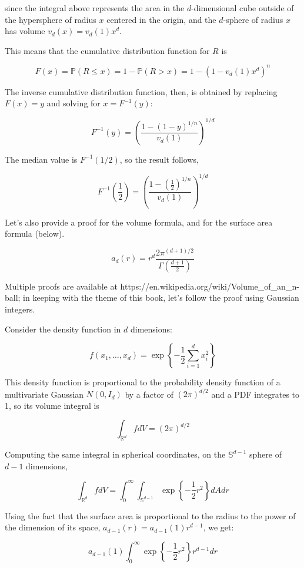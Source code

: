 since the integral above represents the area in the \(d\)-dimensional
cube outside of the hypersphere of radius \(x\) centered in the origin,
and the \(d\)-sphere of radius \(x\) has volume \(v_d(x) = v_d(1) x^d\).

This means that the cumulative distribution function for \(R\) is

\[F(x) = \mathbb{P}(R \leq x) = 1 - \mathbb{P}(R > x) = 1 - \left(1 - v_d(1) x^d\right)^n\]

The inverse cumulative distribution function, then, is obtained by
replacing \(F(x) = y\) and solving for \(x = F^{-1}(y)\):

\[ F^{-1}(y) = \left( \frac{1 - (1 - y)^{1/n}}{v_d(1)} \right)^{1/d} \]

The median value is \(F^{-1}(1/2)\), so the result follows,

\[ F^{-1}\left( \frac{1}{2} \right) = \left( \frac{1 - \left( \frac{1}{2} \right)^{1/n}}{v_d(1)} \right)^{1/d}\]

Let's also provide a proof for the volume formula, and for the surface
area formula (below).

\[ a_d(r) = r^d \frac{2 \pi^{(d + 1)/2}}{\Gamma \left( \frac{d + 1}{2}\right)}  \]

Multiple proofs are available at
https://en.wikipedia.org/wiki/Volume\_of\_an\_n-ball; in keeping with
the theme of this book, let's follow the proof using Gaussian integers.

Consider the density function in \(d\) dimensions:

\[ f(x_1, \dots, x_d) = \exp \left\{ -\frac{1}{2} \sum_{i=1}^d x_i^2 \right\} \]

This density function is proportional to the probability density
function of a multivariate Gaussian \(N(0, I_d)\) by a factor of
\((2 \pi)^{d/2}\) and a PDF integrates to 1, so its volume integral is

\[ \int_{\mathbb{R}^d} f dV = (2 \pi)^{d/2}\]

Computing the same integral in spherical coordinates, on the
\(\mathbb{S}^{d - 1}\) sphere of \(d - 1\) dimensions,

\[ \int_{\mathbb{R}^d} f dV = \int_0^\infty \int_{\mathbb{S}^{d - 1}} \exp \left\{ -\frac{1}{2} r^2 \right\} dA dr \]

Using the fact that the surface area is proportional to the radius to
the power of the dimension of its space,
\(a_{d-1}(r) = a_{d-1}(1) r^{d-1}\), we get:

\[ a_{d-1}(1) \int_0^\infty \exp \left\{ -\frac{1}{2} r^2 \right\} r^{d - 1} dr \]

